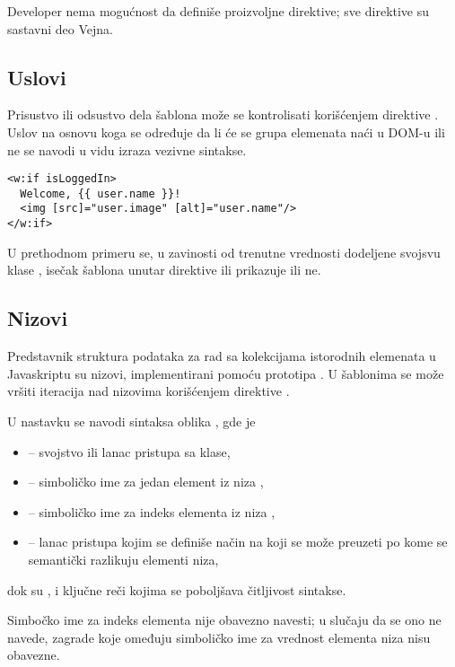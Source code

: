 Developer nema mogućnost da definiše proizvoljne direktive; sve direktive su sastavni deo Vejna.

\subsection{Uslovi}

Prisustvo ili odsustvo dela šablona može se kontrolisati korišćenjem direktive .
Uslov na osnovu koga se određuje da li će se grupa elemenata naći u DOM-u ili ne se navodi u vidu izraza vezivne sintakse.

\begin{verbatim}
<w:if isLoggedIn>
  Welcome, {{ user.name }}!
  <img [src]="user.image" [alt]="user.name"/>
</w:if>
\end{verbatim}

U prethodnom primeru se, u zavinosti od trenutne vrednosti dodeljene svojsvu klase , isečak šablona unutar direktive  ili prikazuje ili ne.

\subsection{Nizovi}

Predstavnik struktura podataka za rad sa kolekcijama istorodnih elemenata u Javaskriptu su nizovi, implementirani pomoću prototipa .
U šablonima se može vršiti iteracija nad nizovima korišćenjem direktive .

U nastavku se navodi sintaksa oblika , gde je

\begin{itemize}
\item {} -- svojstvo ili lanac pristupa sa klase,
\item {} -- simboličko ime za jedan element iz niza ,
\item {} -- simboličko ime za indeks elementa  iz niza ,
\item {} -- lanac pristupa kojim se definiše način na koji se može preuzeti  po kome se semantički razlikuju elementi niza,
\end{itemize}

dok su , \code{;} i  ključne reči kojima se poboljšava čitljivost sintakse.

Simbočko ime za indeks elementa nije obavezno navesti; u slučaju da se ono ne navede, zagrade koje omeđuju simboličko ime za vrednost elementa niza nisu obavezne.


